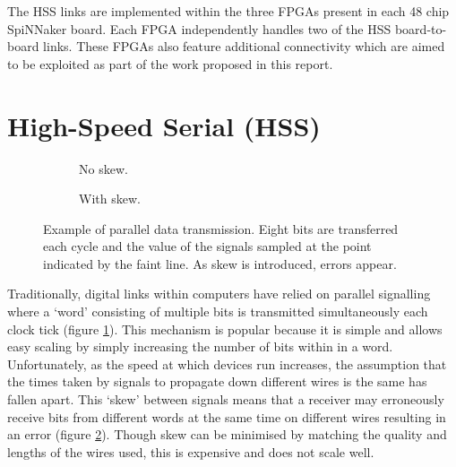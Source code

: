 			The HSS links are implemented within the three FPGAs present in each 48
			chip SpiNNaker board. Each FPGA independently handles two of the HSS
			board-to-board links. These FPGAs also feature additional connectivity
			which are aimed to be exploited as part of the work proposed in this
			report.
	
	\section{High-Speed Serial (HSS)}
		\label{sec:high-speed-serial}
		
		
		\begin{figure}
			\begin{subfigure}{0.48\textwidth}
				\center
				\begin{tikzpicture}[thick, node distance=0.2cm, xscale=0.40]
					
					
					
				\end{tikzpicture}
				
				\caption{No skew.}
				\label{fig:parcons-no-skew}
			\end{subfigure}
			\begin{subfigure}{0.48\textwidth}
				\center
				\begin{tikzpicture}[thick, node distance=0.2cm, xscale=0.40]
					
					
					
				\end{tikzpicture}
				
				\caption{With skew.}
				\label{fig:parcons-with-skew}
			\end{subfigure}
			
			\caption[Parallel signalling example.]{Example of parallel data
			transmission. Eight bits are transferred each cycle and the value of the
			signals sampled at the point indicated by the faint line. As skew is
			introduced, errors appear.}
			\label{fig:parcons} \end{figure}
		
		Traditionally, digital links within computers have relied on parallel
		signalling where a `word' consisting of multiple bits is transmitted
		simultaneously each clock tick (figure \ref{fig:parcons-no-skew}). This
		mechanism is popular because it is simple and allows easy scaling by simply
		increasing the number of bits within in a word. Unfortunately, as the speed
		at which devices run increases, the assumption that the times taken by
		signals to propagate down different wires is the same has fallen apart. This
		`skew' between signals means that a receiver may erroneously receive bits
		from different words at the same time on different wires resulting in an
		error (figure \ref{fig:parcons-with-skew}). Though skew can be minimised by
		matching the quality and lengths of the wires used, this is expensive and
		does not scale well.
		
